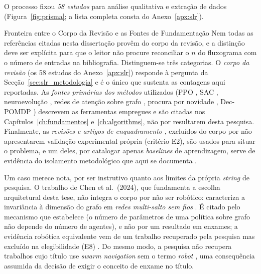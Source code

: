 \documentclass[12pt,reqno, twoside]{amsbook}
\makeatletter
\def\subsection{\@startsection{subsection}{2}%
      \z@{.5\linespacing\@plus.7\linespacing}{.25\linespacing}%
      {\normalfont\bfseries\flushleft}}
\theoremstyle{plain}
\numberwithin{equation}{chapter}
\numberwithin{section}{chapter}
\numberwithin{table}{chapter}
\numberwithin{figure}{chapter}
\makeatother
\begin{document}
O processo fixou \emph{58 estudos} para análise qualitativa e extração de dados (Figura~\ref{fig:prisma}; a lista completa consta do Anexo~\ref{apx:slr}).

\subsection{Fronteira entre o Corpo da Revisão e as Fontes de Fundamentação}
Nem todas as referências citadas nesta dissertação provêm do corpo da revisão, e a distinção deve ser explícita para que o leitor não procure reconciliar o $n$ do fluxograma com o número de entradas na bibliografia. Distinguem-se três categorias. O \emph{corpo da revisão} (os 58 estudos do Anexo~\ref{apx:slr}) responde à pergunta da Secção~\ref{sec:slr_metodologia} e é o único que sustenta as contagens aqui reportadas. As \emph{fontes primárias dos métodos} utilizados (PPO \cite{schulman2017ppo}, SAC \cite{haarnoja2018sac}, neuroevolução \cite{such2017deep, salimans2017es}, redes de atenção sobre grafo \cite{velickovic2018gat}, procura por novidade \cite{lehman2011abandoning}, Dec-POMDP \cite{oliehoek2016concise}) descrevem as ferramentas empregues e são citadas nos Capítulos~\ref{ch:fundamentos} e~\ref{ch:algorithms}, não por resultarem desta pesquisa. Finalmente, as \emph{revisões e artigos de enquadramento} \cite{kegeleirs2025towards, majid2023deep, bettini2024benchmarl}, excluídos do corpo por não apresentarem validação experimental própria (critério E2), são usados para situar o problema, e um deles, por catalogar apenas \textit{baselines} de aprendizagem, serve de evidência do isolamento metodológico que aqui se documenta \cite{bettini2024benchmarl}.

Um caso merece nota, por ser instrutivo quanto aos limites da própria \textit{string} de pesquisa. O trabalho de Chen et al.~(2024), que fundamenta a escolha arquitetural desta tese, não integra o corpo por não ser robótico: caracteriza a invariância à dimensão do grafo em \emph{redes multi-salto sem fios} \cite{chen2024graph}. É citado pelo mecanismo que estabelece (o número de parâmetros de uma política sobre grafo não depende do número de agentes), e não por um resultado em enxames; a evidência robótica equivalente vem de um trabalho recuperado pela pesquisa mas excluído na elegibilidade (E8) \cite{zhang2022h2gnn}. Do mesmo modo, a pesquisa não recupera trabalhos cujo título use \textit{swarm navigation} sem o termo \textit{robot} \cite{yigit2026marl}, uma consequência assumida da decisão de exigir o conceito de enxame no título.
\end{document}
